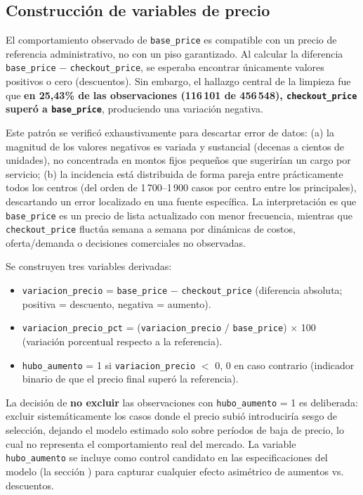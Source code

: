 \documentclass[doc, a4paper, biblatex, floatsintext, longtable, babel]{apa7}
\begin{document}
\subsection{Construcci\'on de variables de precio}
\label{sec:vars_precio}

El comportamiento observado de \texttt{base\_price} es compatible con un precio de referencia administrativo, no con un piso garantizado. Al calcular la diferencia \texttt{base\_price} $-$ \texttt{checkout\_price}, se esperaba encontrar \'unicamente valores positivos o cero (descuentos). Sin embargo, el hallazgo central de la limpieza fue que \textbf{en 25,43\% de las observaciones (116\,101 de 456\,548), \texttt{checkout\_price} super\'o a \texttt{base\_price}}, produciendo una variaci\'on negativa.

Este patr\'on se verific\'o exhaustivamente para descartar error de datos: (a) la magnitud de los valores negativos es variada y sustancial (decenas a cientos de unidades), no concentrada en montos fijos peque\~nos que sugerir\'ian un cargo por servicio; (b) la incidencia est\'a distribuida de forma pareja entre pr\'acticamente todos los centros (del orden de 1\,700--1\,900 casos por centro entre los principales), descartando un error localizado en una fuente espec\'ifica. La interpretaci\'on es que \texttt{base\_price} es un precio de lista actualizado con menor frecuencia, mientras que \texttt{checkout\_price} fluct\'ua semana a semana por din\'amicas de costos, oferta/demanda o decisiones comerciales no observadas.

\medskip
\noindent Se construyen tres variables derivadas:

\begin{itemize}
    \item \texttt{variacion\_precio} = \texttt{base\_price} $-$ \texttt{checkout\_price} (diferencia absoluta; positiva = descuento, negativa = aumento).
    \item \texttt{variacion\_precio\_pct} = (\texttt{variacion\_precio} / \texttt{base\_price}) $\times$ 100 (variaci\'on porcentual respecto a la referencia).
    \item \texttt{hubo\_aumento} = 1 si \texttt{variacion\_precio} $<$ 0, 0 en caso contrario (indicador binario de que el precio final super\'o la referencia).
\end{itemize}

La decisi\'on de \textbf{no excluir} las observaciones con \texttt{hubo\_aumento} = 1 es deliberada: excluir sistem\'aticamente los casos donde el precio subi\'o introducir\'ia sesgo de selecci\'on, dejando el modelo estimado solo sobre per\'iodos de baja de precio, lo cual no representa el comportamiento real del mercado. La variable \texttt{hubo\_aumento} se incluye como control candidato en las especificaciones del modelo (la secci\'on ) para capturar cualquier efecto asim\'etrico de aumentos vs. descuentos.
\end{document}
